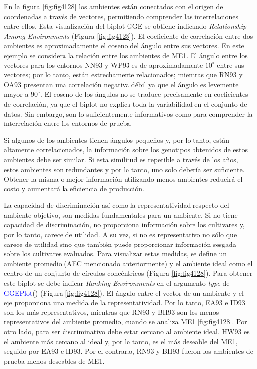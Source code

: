 En la figura \ref{fig:fig4128} los ambientes están conectados con el origen de coordenadas a través de vectores, permitiendo comprender las interrelaciones entre ellos.  Esta visualización del biplot GGE se obtiene indicando \emph{Relationship Among Environments} (Figura \ref{fig:fig4128}). El coeficiente de correlación entre dos ambientes es aproximadamente el coseno del ángulo entre sus vectores. 
En este ejemplo se considera la relación entre los ambientes de ME1. El ángulo entre los vectores para los entornos NN93 y WP93 es de aproximadamente $10^{\circ}$ entre sus vectores; por lo tanto, están estrechamente relacionados; mientras que RN93 y OA93 presentan una correlación negativa débil ya que el ángulo es levemente mayor a $90^{\circ}$. El coseno de los ángulos no se traduce precisamente en coeficientes de correlación, ya que el biplot no explica toda la variabilidad en el conjunto de datos. Sin embargo, son lo suficientemente informativos como para comprender la interrelación entre los entornos de prueba. 

Si algunos de los ambientes tienen ángulos pequeños y, por lo tanto, están altamente correlacionados, la información sobre los genotipos obtenidos de estos ambientes debe ser similar. Si esta similitud es repetible a través de los años, estos ambientes son redundantes y por lo tanto, uno solo debería ser suficiente. Obtener la misma o mejor información utilizando menos ambientes reducirá el costo y aumentará la eficiencia de producción.


La capacidad de discriminación así como la representatividad respecto del ambiente objetivo, son medidas fundamentales para un ambiente. Si no tiene capacidad de discriminación, no proporciona información sobre los cultivares y, por lo tanto, carece de utilidad. A su vez, si no es representativo no sólo que carece de utilidad sino que también puede proporcionar información sesgada sobre los cultivares evaluados. Para visualizar estas medidas, se define un ambiente promedio (AEC mencionado anteriormente) y el ambiente ideal como el centro de un conjunto de círculos concéntricos (Figura \ref{fig:fig4128}). Para obtener este biplot se debe indicar \emph{Ranking Environments} en el argumento \emph{type} de \textcolor{blue}{GGEPlot}() (Figura \ref{fig:fig4128}). El ángulo entre el vector de un ambiente y el eje proporciona una medida de la representatividad. Por lo tanto, EA93 e ID93 son los más representativos, mientras que RN93 y BH93 son los menos representativos del ambiente promedio, cuando se analiza ME1 \ref{fig:fig4128}. Por otro lado, para ser discriminativo debe estar cercano al ambiente ideal. HW93 es el ambiente más cercano al ideal y, por lo tanto, es el más deseable del ME1, seguido por EA93 e ID93. Por el contrario, RN93 y BH93 fueron los ambientes de prueba menos deseables de ME1. 

